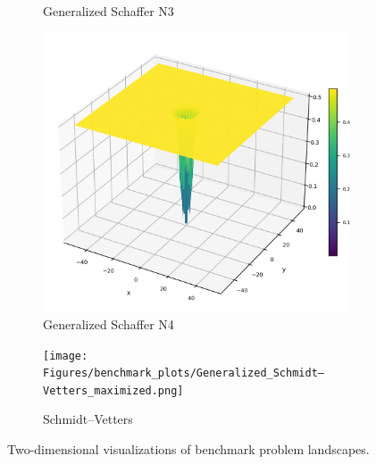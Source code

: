 \begin{figure}[!hb]
\begin{subfigure}{0.32\textwidth}
        \caption{Generalized Schaffer N3}
    \end{subfigure}
      \begin{subfigure}{0.32\textwidth}
        \centering
        \includegraphics[width=1\textwidth]{Figures/benchmark_plots/Generalized_Schaffer_N4_maximized.png}
        \caption{Generalized Schaffer N4}
    \end{subfigure}
        \begin{subfigure}{0.32\textwidth}
        \centering
        \texttt{[image: Figures/benchmark\_plots/Generalized\_Schmidt–Vetters\_maximized.png]}
        \caption{Schmidt–Vetters}
    \end{subfigure}
    \caption[Visualizations of benchmark problem landscapes]{Two-dimensional visualizations of benchmark problem landscapes.}
\end{figure}


